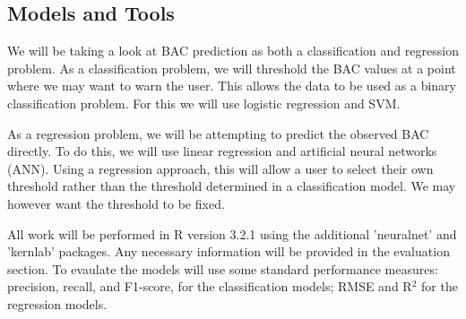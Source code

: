 \subsection{Models and Tools}

We will be taking a look at BAC prediction as both a classification and regression problem. As a classification problem, we will threshold the BAC values at a point where we may want to warn the user. This allows the data to be used as a binary classification problem. For this we will use logistic regression and SVM. 

As a regression problem, we will be attempting to predict the observed BAC directly. To do this, we will use linear regression and artificial neural networks (ANN). Using a regression approach, this will allow a user to select their own threshold rather than the threshold determined in a classification model. We may however want the threshold to be fixed.

All work will be performed in R version 3.2.1 using the additional 'neuralnet' and 'kernlab' packages. Any necessary information will be provided in the evaluation section. To evaulate the models will use some standard performance measures: precision, recall, and F1-score, for the classification models; RMSE and R$^2$ for the regression models.